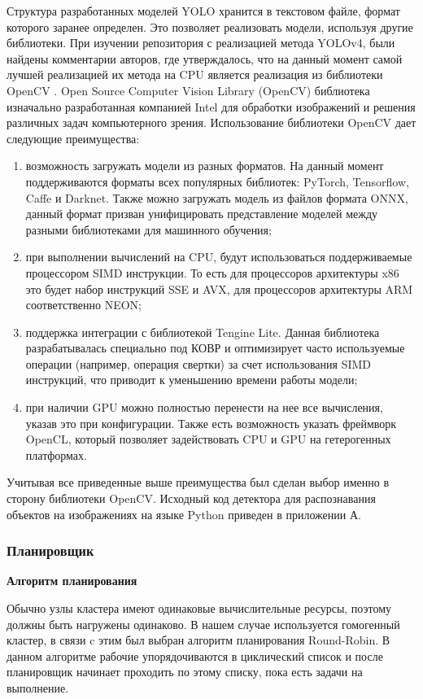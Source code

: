 Структура разработанных моделей YOLO хранится в текстовом файле, формат которого заранее определен. Это позволяет реализовать модели, 
используя другие библиотеки. При изучении репозитория с реализацией метода YOLOv4, были найдены комментарии авторов, где утверждалось, 
что на данный момент самой лучшей реализацией их метода на CPU является реализация из библиотеки OpenCV \cite{YOLO4_IMPL}. 
Open Source Computer Vision Library (OpenCV) библиотека изначально разработанная компанией Intel для обработки изображений 
и решения различных задач компьютерного зрения. Использование библиотеки OpenCV дает следующие преимущества:

\begin{enumerate}
\item возможность загружать модели из разных форматов. На данный момент поддерживаются форматы всех популярных библиотек: 
PyTorch, Tensorflow, Caffe и Darknet. Также можно загружать модель из файлов формата ONNX, данный формат призван 
унифицировать представление моделей между разными библиотеками для машинного обучения;
\item при выполнении вычислений на CPU, будут использоваться поддерживаемые процессором SIMD инструкции. То есть для процессоров 
архитектуры x86 это будет набор инструкций SSE и AVX, для процессоров архитектуры ARM соответственно NEON;
\item поддержка интеграции с библиотекой Tengine Lite. Данная библиотека разрабатывалась специально под КОВР и оптимизирует
часто используемые операции (например, операция свертки) за счет использования SIMD инструкций, что приводит 
к уменьшению времени работы модели;
\item при наличии GPU можно полностью перенести на нее все вычисления, указав это при конфигурации. Также есть возможность 
указать фреймворк OpenCL, который позволяет задействовать CPU и GPU на гетерогенных платформах.
\end{enumerate}

Учитывая все приведенные выше преимущества был сделан выбор именно в сторону библиотеки OpenCV. Исходный код детектора 
для распознавания объектов на изображениях на языке Python приведен в приложении А.

\subsubsection{Планировщик}

\textbf{Алгоритм планирования}

Обычно узлы кластера имеют одинаковые вычислительные ресурсы, поэтому должны быть нагружены одинаково. В нашем случае 
используется гомогенный кластер, в связи c этим был выбран алгоритм планирования Round-Robin. В данном алгоритме рабочие
упорядочиваются в циклический список и после планировщик начинает проходить по этому списку, пока есть задачи на выполнение.


